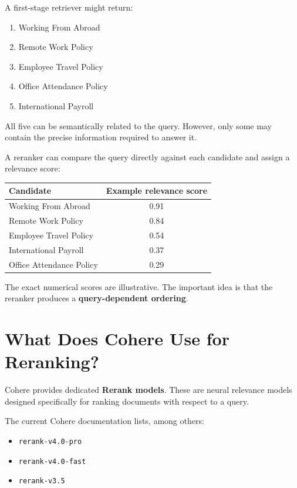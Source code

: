 \documentclass[12pt, a4paper]{article}
\begin{document}
A first-stage retriever might return:

\begin{enumerate}
    \item Working From Abroad
    \item Remote Work Policy
    \item Employee Travel Policy
    \item Office Attendance Policy
    \item International Payroll
\end{enumerate}

All five can be semantically related to the query. However, only some may contain the precise information required to answer it.

A reranker can compare the query directly against each candidate and assign a relevance score:

\begin{center}
\begin{tabular}{p{}c}
\toprule
Candidate & Example relevance score\\
\midrule
Working From Abroad & 0.91\\
Remote Work Policy & 0.84\\
Employee Travel Policy & 0.54\\
International Payroll & 0.37\\
Office Attendance Policy & 0.29\\
\bottomrule
\end{tabular}
\end{center}

The exact numerical scores are illustrative. The important idea is that the reranker produces a \textbf{query-dependent ordering}.

\section{What Does Cohere Use for Reranking?}

Cohere provides dedicated \textbf{Rerank models}. These are neural relevance models designed specifically for ranking documents with respect to a query.

The current Cohere documentation lists, among others:

\begin{itemize}
    \item \texttt{rerank-v4.0-pro}
    \item \texttt{rerank-v4.0-fast}
    \item \texttt{rerank-v3.5}
\end{itemize}
\end{document}
